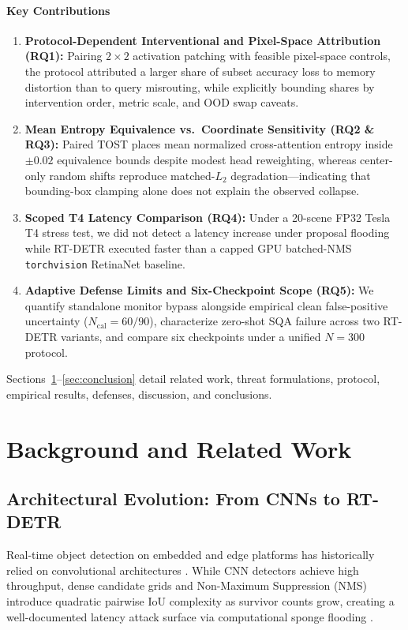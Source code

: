 \documentclass[preprint,10pt]{elsarticle}
\begin{document}
\paragraph{Key Contributions}
\begin{enumerate}
    \item \textbf{Protocol-Dependent Interventional and Pixel-Space Attribution (RQ1):} Pairing $2 \times 2$ activation patching with feasible pixel-space controls, the protocol attributed a larger share of subset accuracy loss to memory distortion than to query misrouting, while explicitly bounding shares by intervention order, metric scale, and OOD swap caveats.
    \item \textbf{Mean Entropy Equivalence vs.\ Coordinate Sensitivity (RQ2 \& RQ3):} Paired TOST places mean normalized cross-attention entropy inside $\pm 0.02$ equivalence bounds despite modest head reweighting, whereas center-only random shifts reproduce matched-$L_2$ degradation---indicating that bounding-box clamping alone does not explain the observed collapse.
    \item \textbf{Scoped T4 Latency Comparison (RQ4):} Under a 20-scene FP32 Tesla T4 stress test, we did not detect a latency increase under proposal flooding while RT-DETR executed faster than a capped GPU batched-NMS \texttt{torchvision} RetinaNet baseline.
    \item \textbf{Adaptive Defense Limits and Six-Checkpoint Scope (RQ5):} We quantify standalone monitor bypass alongside empirical clean false-positive uncertainty ($N_{\mathrm{cal}}=60/90$), characterize zero-shot SQA failure across two RT-DETR variants, and compare six checkpoints under a unified $N=300$ protocol.
\end{enumerate}

Sections~\ref{sec:background}--\ref{sec:conclusion} detail related work, threat formulations, protocol, empirical results, defenses, discussion, and conclusions.

\section{Background and Related Work}
\label{sec:background}

\subsection{Architectural Evolution: From CNNs to RT-DETR}
Real-time object detection on embedded and edge platforms has historically relied on convolutional architectures \citep{ren2015faster, redmon2016you, bochkovskiy2020yolov4, liu2016ssd, wang2023yolov7}. While CNN detectors achieve high throughput, dense candidate grids and Non-Maximum Suppression (NMS) \citep{neubeck2006efficient, bodla2017soft} introduce quadratic pairwise IoU complexity as survivor counts grow, creating a well-documented latency attack surface via computational sponge flooding \citep{shumailov2021sponge, chen2024overload, shapira2023phantom}.
\end{document}
